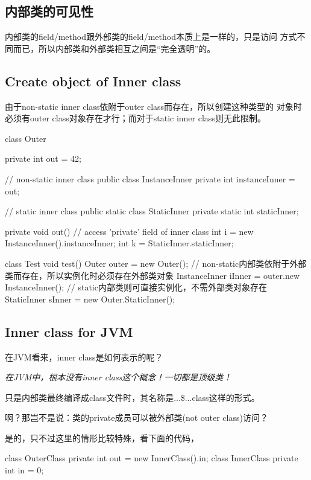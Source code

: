 \documentclass[a4paper,11pt]{article}
\begin{document}
\subsection[内部类的可见性]{内部类的可见性}
内部类的field/method跟外部类的field/method本质上是一样的，只是访问
方式不同而已，所以内部类和外部类相互之间是“完全透明”的。

\subsection[Create object of Inner class ]{Create object of Inner class}
由于non-static inner class依附于outer class而存在，所以创建这种类型的
对象时必须有outer class对象存在才行；而对于static inner class则无此限制。

\begin{javacode}
class Outer {
  private int out = 42;

  // non-static inner class
  public class InstanceInner {
    private int instanceInner = out;
  }

  // static inner class
  public static class StaticInner {
    private static int staticInner;
  }

  private void out() {
    // access 'private' field of inner class
    int i = new InstanceInner().instanceInner;
    int k = StaticInner.staticInner;
  }
}

class Test {
  void test() {
    Outer outer = new Outer();
    // non-static内部类依附于外部类而存在，所以实例化时必须存在外部类对象
    InstanceInner iInner = outer.new InstanceInner();
    // static内部类则可直接实例化，不需外部类对象存在
    StaticInner sInner = new Outer.StaticInner();
  }
}
\end{javacode}

\subsection[Inner class for JVM]{Inner class for JVM}
在JVM看来，inner class是如何表示的呢？

\emph{在JVM中，根本没有inner class这个概念！一切都是顶级类！}

只是内部类最终编译成class文件时，其名称是...\$...class这样的形式。

啊？那岂不是说：类的private成员可以被外部类(not outer class)访问？

是的，只不过这里的情形比较特殊，看下面的代码，

\begin{javacode}
class OuterClass {
  private int out = new InnerClass().in;
  class InnerClass {
    private int in = 0;
  }
}
\end{javacode}
\end{document}
